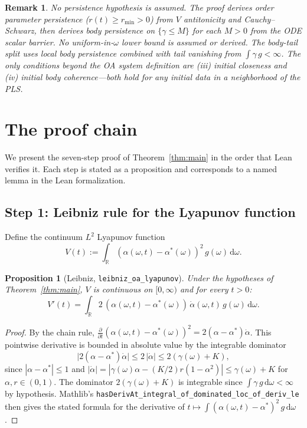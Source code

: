 \documentclass[11pt,a4paper]{article}
\newtheorem{proposition}[theorem]{Proposition}
\newtheorem{remark}[theorem]{Remark}
\theoremstyle{definition}
\newcommand{\R}{\mathbb{R}}
\begin{document}
\begin{remark}
No persistence hypothesis is assumed. The proof \emph{derives} order parameter persistence ($r(t) \geq r_{\min} > 0$) from $V$ antitonicity and Cauchy--Schwarz, then derives body persistence on $\{\gamma \leq M\}$ for each $M > 0$ from the ODE scalar barrier. No uniform-in-$\omega$ lower bound is assumed or derived. The body-tail split uses local body persistence combined with tail vanishing from $\int \gamma\,g < \infty$. The only conditions beyond the OA system definition are (iii) initial closeness and (iv) initial body coherence---both hold for any initial data in a neighborhood of the PLS.
\end{remark}

\section{The proof chain}\label{sec:proof}

We present the seven-step proof of Theorem~\ref{thm:main} in the order that Lean verifies it. Each step is stated as a proposition and corresponds to a named lemma in the Lean formalization.

\subsection{Step 1: Leibniz rule for the Lyapunov function}\label{sec:leibniz}

Define the continuum $L^2$ Lyapunov function
\begin{equation}\label{eq:V}
V(t) := \int_\R (\alpha(\omega,t) - \alpha^*(\omega))^2\,g(\omega)\,\mathrm{d}\omega.
\end{equation}

\begin{proposition}[Leibniz, \texttt{leibniz\_oa\_lyapunov}]\label{prop:leibniz}
Under the hypotheses of Theorem~\ref{thm:main}, $V$ is continuous on $[0,\infty)$ and for every $t > 0$:
\[
V'(t) = \int_\R 2\,(\alpha(\omega,t) - \alpha^*(\omega))\,\dot{\alpha}(\omega,t)\,g(\omega)\,\mathrm{d}\omega.
\]
\end{proposition}

\begin{proof}
By the chain rule, $\frac{\partial}{\partial t}(\alpha(\omega,t) - \alpha^*(\omega))^2 = 2(\alpha - \alpha^*)\dot{\alpha}$. This pointwise derivative is bounded in absolute value by the integrable dominator
\[
\bigl|2(\alpha - \alpha^*)\dot{\alpha}\bigr| \leq 2\,|\dot{\alpha}| \leq 2(\gamma(\omega) + K),
\]
since $|\alpha - \alpha^*| \leq 1$ and $|\dot{\alpha}| = |\gamma(\omega)\alpha - (K/2)r(1-\alpha^2)| \leq \gamma(\omega) + K$ for $\alpha, r \in (0,1)$. The dominator $2(\gamma(\omega) + K)$ is integrable since $\int \gamma\,g\,\mathrm{d}\omega < \infty$ by hypothesis. Mathlib's \texttt{hasDerivAt\_integral\_of\_dominated\_loc\_of\_deriv\_le} then gives the stated formula for the derivative of $t \mapsto \int (\alpha(\omega,t) - \alpha^*)^2\,g\,\mathrm{d}\omega$.
\end{proof}
\end{document}
